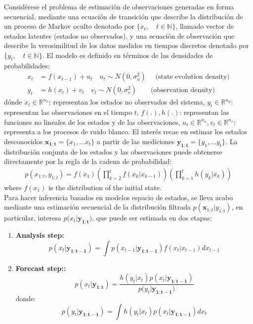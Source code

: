 Considérese el problema de estimación de observaciones generadas en forma secuencial, mediante una ecuación de transición que describe
 la distribución de un proceso de Markov oculto denotado por $\{x_{t},\quad t\in \mathbb{N}\}$, llamado vector de estados latentes (estados no observados), y una ecuación de observación que describe la verosimilitud de los datos medidos en tiempos discretos denotado por $\{y_{t},\quad t\in \mathbb{N}\}$. El modelo es definido en términos de las
 densidades de probabilidades:  
\begin{equation}\label{eq:ModeloEspacioEstado}
\begin{split}
x_{t}&= f(x_{t-1})+u_{t} \quad u_{t}\sim N(0,\sigma_{u}^{2}) \quad \textrm{ (state evolution density)} \\
y_{t}&= h(x_{t})+ v_{t} \quad v_{t}\sim N(0,\sigma_{v}^{2}) \quad \quad \textrm{(observation density)}
\end{split}
\end{equation}
 dónde $x_{t}\in \mathbb{R}^{n_{x}}$: representan los estados no observados del sistema,
 $y_{t}\in \mathbb{R}^{n_{y}}$: representan las observaciones en el tiempo $t$,
 $f(.), h(.)$: representan las funciones no lineales de los estados y de las observaciones,
 $u_{t}\in \mathbb{R}^{n_{u}},  v_{t}\in\mathbb{R}^{n_{v}}$: representa a los procesos de ruido blanco.
El interés recae en estimar los estados desconocidos
$\mathbf{x_{1:t}}=\{x_{1},\ldots x_{t}\}$ a partir de las mediciones
$\mathbf{y_{1:t}}=\{y_{1},\ldots y_{t}\}$.
La distribución conjunta de los estados y las observaciones puede obtenerse
 directamente por la regla de la cadena de probabilidad:
 \begin{align*}
 	p\left(x_{1:t},y_{1:t} \right)=f\left(x_{1}\right) 
 	\left(\prod_{k=2}^{t}  f\left(x_{k}|x_{k-1}\right) \right) 
 	\left(\prod_{k=1}^{t}h\left(y_{k}|x_{k}\right) \right) 
 \end{align*}
 where $f\left(x_{1}\right)$ is the distribution of the initial state.\\
 Para hacer inferencia basados en modelos espacio de estados, se lleva
 acabo mediante una estimación secuencial de la distribución filtrada
 $p(\mathbf{x}_{1:t}|y_{1:t})$, en particular,
interesa $p(x_{t}|\mathbf{y_{1:t})}$, que puede ser estimada en
dos etapas:
\begin{enumerate}
	\item \textbf{Analysis step:}
	\begin{equation}\label{eq:EcuacionDePrediccion}
	p(x_{t}|\mathbf{y_{1:t-1}}) =%
		\int p(x_{t-1}|\mathbf{y_{1:t-1}})f(x_{t}|x_{t-1})dx_{t-1}
	\end{equation}
	\item \textbf{Forecast step::}
	\begin{equation}\label{eq:EcuacionDeActualizacion}
		p(x_{t}|\mathbf{y_{1:t}}) =%
	\frac{h(y_{t}|x_{t})p(x_{t}|\mathbf{y_{1:t-1}})}
	{p(y_{t}|\mathbf{y_{1:t-1})}}
	\end{equation}
	donde:
	\begin{equation}\label{eq:PosteriorDeLosDatosDadosLosAnteriores}
		p(y_{t}|\mathbf{y_{1:t-1}})=\int h(y_{t}|x_{t})
		p(x_{t}|\mathbf{y_{1:t-1}})dx_{t}
	\end{equation}
\end{enumerate}
